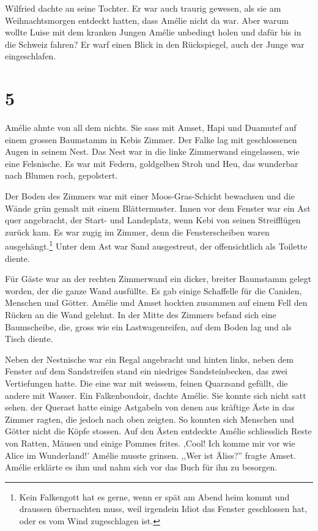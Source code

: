 \documentclass[11pt,titlepage,a5paper]{book}
\begin{document}
Wilfried dachte an seine Tochter. Er war auch traurig gewesen, als sie am Weihnachtsmorgen entdeckt hatten, dass Amélie nicht da war. Aber warum wollte Luise mit dem kranken Jungen Amélie unbedingt holen und dafür bis in die Schweiz fahren? Er warf einen Blick in den Rückspiegel, auch der Junge war eingeschlafen. 

\section*{5}

Amélie ahnte von all dem nichts. Sie sass mit Amset, Hapi und Duamutef auf einem grossen Baumstamm in Kebis Zimmer. Der Falke lag mit geschlossenen Augen in seinem Nest. Das Nest war in die linke Zimmerwand eingelassen, wie eine Felsnische. Es war mit Federn, goldgelben Stroh und Heu, das wunderbar nach Blumen roch, gepolstert.

Der Boden des Zimmers war mit einer Moos-Gras-Schicht bewachsen und die Wände grün gemalt mit einem Blättermuster. Innen vor dem Fenster war ein Ast quer angebracht, der Start- und Landeplatz, wenn Kebi von seinen Streifflügen zurück kam. Es war zugig im Zimmer, denn die Fensterscheiben waren ausgehängt.\footnote{Kein Falkengott hat es gerne, wenn er spät am Abend heim kommt und draussen übernachten muss, weil irgendein Idiot das Fenster geschlossen hat, oder es vom Wind zugeschlagen ist.}  Unter dem Ast war Sand ausgestreut, der offensichtlich als Toilette diente.

Für Gäste war an der rechten Zimmerwand ein dicker, breiter Baumstamm gelegt worden, der die ganze Wand ausfüllte. Es gab einige Schaffelle für die Caniden, Menschen und Götter. Amélie und Amset hockten zusammen auf einem Fell den Rücken an die Wand gelehnt. In der Mitte des Zimmers befand sich eine Baumscheibe, die, gross wie ein Lastwagenreifen, auf dem Boden lag und als Tisch diente.

 Neben der Nestnische war ein Regal angebracht und hinten links, neben dem Fenster auf dem Sandstreifen stand ein niedriges Sandsteinbecken, das zwei Vertiefungen hatte. Die eine war mit weissem, feinen Quarzsand gefüllt, die andere mit Wasser. Ein Falkenboudoir, dachte Amélie. Sie konnte sich nicht satt sehen. der Querast hatte einige Astgabeln von denen aus kräftige Äste in das Zimmer ragten, die jedoch nach oben zeigten. So konnten sich Menschen und Götter nicht die Köpfe stossen. Auf den Ästen entdeckte Amélie schliesslich Reste von Ratten, Mäusen und einige Pommes frites. ,Cool! Ich komme mir vor wie Alice im Wunderland!' Amélie musste grinsen. ,,Wer ist Äliss?'' fragte Amset. Amélie erklärte es ihm und nahm sich vor das Buch für ihn zu besorgen.
 
\end{document}
